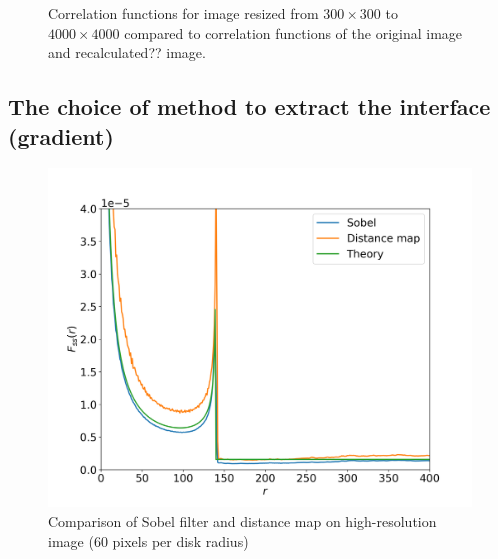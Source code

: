 \documentclass[reprint,amsmath,amssymb,aps,pre,showkeys,showpacs]{revtex4-1}
\begin{document}
\begin{figure}[ht]
  \centering
  \hfill
  \caption[]{Correlation functions for image resized from $300 \times 300$ to
    $4000 \times 4000$ compared to correlation functions of the original image
    and recalculated?? image.}
  \label{fig:resized-cfs}
\end{figure}

\subsection{The choice of method to extract the interface (gradient)}

\begin{figure}[ht]
  \centering
  \includegraphics[width=0.99\linewidth]{images/sobel-vs-distance-map.png}
  \caption{Comparison of Sobel filter and distance map on high-resolution image (60 pixels per disk radius)}
  \label{fig:sobel-vs-distance-map}
\end{figure}
\end{document}
